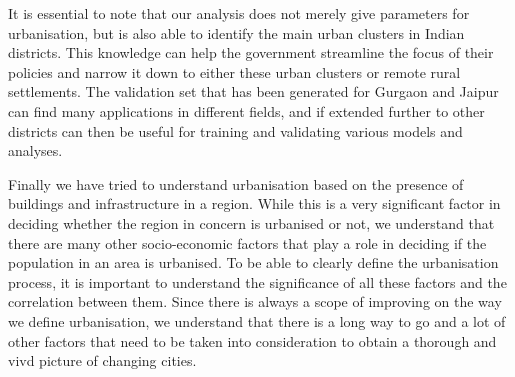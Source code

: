 It is essential to note that our analysis does not merely give parameters for urbanisation, but is also able to identify the main urban clusters in Indian districts. This knowledge can help the government streamline the focus of their policies and narrow it down to either these urban clusters or remote rural settlements. The validation set that has been generated for Gurgaon and Jaipur can find many applications in different fields, and if extended further to other districts can then be useful for training and validating various models and analyses.

Finally we have tried to understand urbanisation based on the presence of buildings and infrastructure in a region. While this is a very significant factor in deciding whether the region in concern is urbanised or not, we understand that there are many other socio-economic factors that play a role in deciding if the population in an area is urbanised. To be able to clearly define the urbanisation process, it is important to understand the significance of all these factors and the correlation between them. Since there is always a scope of improving on the way we define urbanisation, we understand that there is a long way to go and a lot of other factors that need to be taken into consideration to obtain a thorough and vivd picture of changing cities.